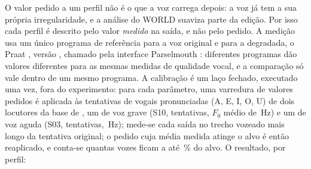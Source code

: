 				\par O valor pedido a um perfil não é o que a voz carrega depois: a voz já tem a sua própria irregularidade, e a análise do WORLD suaviza parte da edição. Por isso cada perfil é descrito pelo valor \emph{medido} na saída, e não pelo pedido. A medição usa um único programa de referência para a voz original e para a degradada, o Praat \cite{boersma2021praat}, versão , chamado pela interface Parselmouth  \cite{jadoul2018parselmouth}: diferentes programas dão valores diferentes para as mesmas medidas de qualidade vocal, e a comparação só vale dentro de um mesmo programa. A calibração é um laço fechado, executado uma vez, fora do experimento: para cada parâmetro, uma varredura de valores pedidos é aplicada às  tentativas de vogais pronunciadas (A, E, I, O, U) de dois locutores da base de , um de voz grave (S10,  tentativas, $F_0$ médio de \,Hz) e um de voz aguda (S03,  tentativas, \,Hz); mede-se cada saída no trecho vozeado mais longo da tentativa original; o pedido cuja média medida atinge o alvo é então reaplicado, e conta-se quantas vozes ficam a até \,\% do alvo. O resultado, por perfil:

